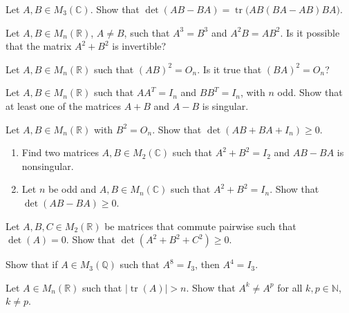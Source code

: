 \documentclass[12pt]{article}
\begin{document}
\begin{problem}
Let $A,B\in M_3(\mathbb{C})$. Show that $\det(AB-BA) = \operatorname{tr}\big(AB(BA-AB)BA\big)$.
\end{problem}

\begin{problem}
Let $A,B\in M_n(\mathbb{R})$, $A\ne B$, such that $A^3=B^3$ and $A^2B=AB^2$. Is it possible that the matrix $A^2+B^2$ is invertible?
\end{problem}

\begin{problem}
Let $A,B\in M_n(\mathbb{R})$ such that $(AB)^2=O_n$. Is it true that $(BA)^2=O_n$?
\end{problem}

\begin{problem}
Let $A,B\in M_n(\mathbb{R})$ such that $AA^T=I_n$ and $BB^T=I_n$, with $n$ odd. Show that at least one of the matrices $A+B$ and $A-B$ is singular.
\end{problem}

\begin{problem}
Let $A,B\in M_n(\mathbb{R})$ with $B^2=O_n$. Show that $\det(AB+BA+I_n) \ge 0$.
\end{problem}

\begin{problem}
\begin{enumerate}[label=(\alph*)]
\item Find two matrices $A,B\in M_2(\mathbb{C})$ such that $A^2+B^2=I_2$ and $AB-BA$ is nonsingular.
\item Let $n$ be odd and $A,B\in M_n(\mathbb{C})$ such that $A^2+B^2=I_n$. Show that $\det(AB-BA)\ge 0$.
\end{enumerate}
\end{problem}

\begin{problem}
Let $A,B,C\in M_2(\mathbb{R})$ be matrices that commute pairwise such that $\det(A)=0$. Show that $\det(A^2+B^2+C^2)\ge 0$.
\end{problem}

\begin{problem}
Show that if $A\in M_3(\mathbb{Q})$ such that $A^8=I_3$, then $A^4=I_3$.
\end{problem}

\begin{problem}
Let $A\in M_n(\mathbb{R})$ such that $|\operatorname{tr}(A)|>n$. Show that $A^k\ne A^p$ for all $k,p\in\mathbb{N}$, $k\ne p$.
\end{problem}
\end{document}
